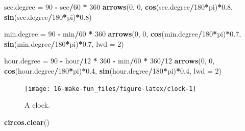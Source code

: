 \documentclass[]{book}
\newenvironment{Shaded}{\begin{snugshade}}{\end{snugshade}}
\newcommand{\KeywordTok}[1]{\textcolor[rgb]{0.13,0.29,0.53}{\textbf{#1}}}
\newcommand{\DataTypeTok}[1]{\textcolor[rgb]{0.13,0.29,0.53}{#1}}
\newcommand{\DecValTok}[1]{\textcolor[rgb]{0.00,0.00,0.81}{#1}}
\newcommand{\FloatTok}[1]{\textcolor[rgb]{0.00,0.00,0.81}{#1}}
\newcommand{\StringTok}[1]{\textcolor[rgb]{0.31,0.60,0.02}{#1}}
\newcommand{\OperatorTok}[1]{\textcolor[rgb]{0.81,0.36,0.00}{\textbf{#1}}}
\newcommand{\NormalTok}[1]{#1}
\theoremstyle{definition}
\theoremstyle{definition}
\theoremstyle{remark}
\begin{document}
\begin{Shaded}
\begin{Highlighting}[]
\NormalTok{sec.degree =}\StringTok{ }\DecValTok{90} \OperatorTok{-}\StringTok{ }\NormalTok{sec}\OperatorTok{/}\DecValTok{60} \OperatorTok{*}\StringTok{ }\DecValTok{360}
\KeywordTok{arrows}\NormalTok{(}\DecValTok{0}\NormalTok{, }\DecValTok{0}\NormalTok{, }\KeywordTok{cos}\NormalTok{(sec.degree}\OperatorTok{/}\DecValTok{180}\OperatorTok{*}\NormalTok{pi)}\OperatorTok{*}\FloatTok{0.8}\NormalTok{, }\KeywordTok{sin}\NormalTok{(sec.degree}\OperatorTok{/}\DecValTok{180}\OperatorTok{*}\NormalTok{pi)}\OperatorTok{*}\FloatTok{0.8}\NormalTok{)}

\NormalTok{min.degree =}\StringTok{ }\DecValTok{90} \OperatorTok{-}\StringTok{ }\NormalTok{min}\OperatorTok{/}\DecValTok{60} \OperatorTok{*}\StringTok{ }\DecValTok{360}
\KeywordTok{arrows}\NormalTok{(}\DecValTok{0}\NormalTok{, }\DecValTok{0}\NormalTok{, }\KeywordTok{cos}\NormalTok{(min.degree}\OperatorTok{/}\DecValTok{180}\OperatorTok{*}\NormalTok{pi)}\OperatorTok{*}\FloatTok{0.7}\NormalTok{, }\KeywordTok{sin}\NormalTok{(min.degree}\OperatorTok{/}\DecValTok{180}\OperatorTok{*}\NormalTok{pi)}\OperatorTok{*}\FloatTok{0.7}\NormalTok{, }\DataTypeTok{lwd =} \DecValTok{2}\NormalTok{)   }

\NormalTok{hour.degree =}\StringTok{ }\DecValTok{90} \OperatorTok{-}\StringTok{ }\NormalTok{hour}\OperatorTok{/}\DecValTok{12} \OperatorTok{*}\StringTok{ }\DecValTok{360} \OperatorTok{-}\StringTok{ }\NormalTok{min}\OperatorTok{/}\DecValTok{60} \OperatorTok{*}\StringTok{ }\DecValTok{360}\OperatorTok{/}\DecValTok{12}
\KeywordTok{arrows}\NormalTok{(}\DecValTok{0}\NormalTok{, }\DecValTok{0}\NormalTok{, }\KeywordTok{cos}\NormalTok{(hour.degree}\OperatorTok{/}\DecValTok{180}\OperatorTok{*}\NormalTok{pi)}\OperatorTok{*}\FloatTok{0.4}\NormalTok{, }\KeywordTok{sin}\NormalTok{(hour.degree}\OperatorTok{/}\DecValTok{180}\OperatorTok{*}\NormalTok{pi)}\OperatorTok{*}\FloatTok{0.4}\NormalTok{, }\DataTypeTok{lwd =} \DecValTok{2}\NormalTok{)}
\end{Highlighting}
\end{Shaded}

\begin{figure}

{\centering \texttt{[image: 16-make-fun\_files/figure-latex/clock-1]} 

}

\caption{A clock.}\label{fig:clock}
\end{figure}

\begin{Shaded}
\begin{Highlighting}[]
\KeywordTok{circos.clear}\NormalTok{()}
\end{Highlighting}
\end{Shaded}
\end{document}
